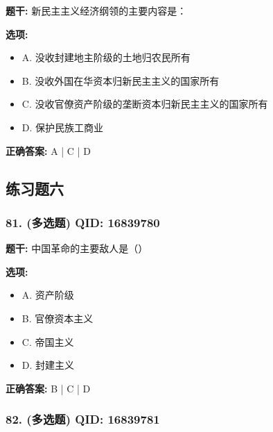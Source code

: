 \documentclass[12pt,UTF8]{ctexart}
\begin{document}
\textbf{题干:}
新民主主义经济纲领的主要内容是：

\textbf{选项:}
\begin{itemize}[leftmargin=*]

  \item A. 没收封建地主阶级的土地归农民所有

  \item B. 没收外国在华资本归新民主主义的国家所有

  \item C. 没收官僚资产阶级的垄断资本归新民主主义的国家所有

  \item D. 保护民族工商业

\end{itemize}

\textbf{正确答案:}
A | C | D

\vspace{0.3em}\hrulefill\vspace{0.7em}

\subsection*{练习题六}

\subsubsection*{81. (多选题) \small QID: 16839780}

\textbf{题干:}
中国革命的主要敌人是（）

\textbf{选项:}
\begin{itemize}[leftmargin=*]

  \item A. 资产阶级

  \item B. 官僚资本主义

  \item C. 帝国主义

  \item D. 封建主义

\end{itemize}

\textbf{正确答案:}
B | C | D

\vspace{0.3em}\hrulefill\vspace{0.7em}

\subsubsection*{82. (多选题) \small QID: 16839781}
\end{document}
